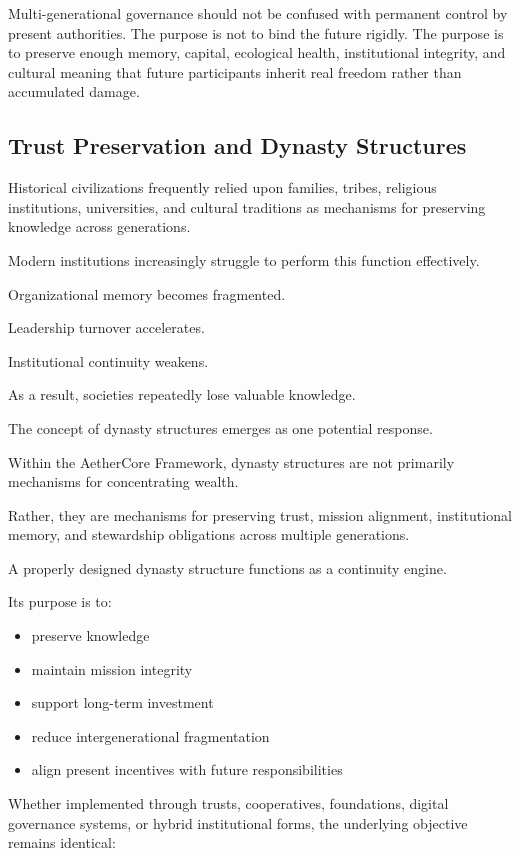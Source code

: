\documentclass[12pt]{article}
\begin{document}
Multi-generational governance should not be confused with permanent control by present authorities. The purpose is not to bind the future rigidly. The purpose is to preserve enough memory, capital, ecological health, institutional integrity, and cultural meaning that future participants inherit real freedom rather than accumulated damage.

\subsection{Trust Preservation and Dynasty Structures}

Historical civilizations frequently relied upon families, tribes, religious institutions, universities, and cultural traditions as mechanisms for preserving knowledge across generations.

Modern institutions increasingly struggle to perform this function effectively.

Organizational memory becomes fragmented.

Leadership turnover accelerates.

Institutional continuity weakens.

As a result, societies repeatedly lose valuable knowledge.

The concept of dynasty structures emerges as one potential response.

Within the AetherCore Framework, dynasty structures are not primarily mechanisms for concentrating wealth.

Rather, they are mechanisms for preserving trust, mission alignment, institutional memory, and stewardship obligations across multiple generations.

A properly designed dynasty structure functions as a continuity engine.

Its purpose is to:

\begin{itemize}
  \item preserve knowledge
  \item maintain mission integrity
  \item support long-term investment
  \item reduce intergenerational fragmentation
  \item align present incentives with future responsibilities
\end{itemize}

Whether implemented through trusts, cooperatives, foundations, digital governance systems, or hybrid institutional forms, the underlying objective remains identical:
\end{document}
